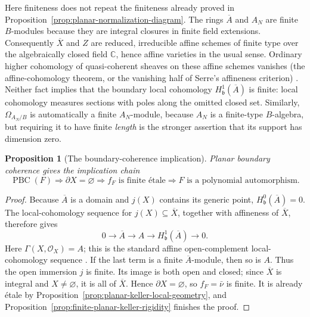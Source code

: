 \documentclass[11pt]{article}
\newtheorem{proposition}[theorem]{Proposition}
\theoremstyle{remark}
\theoremstyle{definition}
\newcommand{\C}{\mathbb C}
\begin{document}
Here finiteness does not repeat the finiteness already proved in
Proposition~\ref{prop:planar-normalization-diagram}.  The rings
\(\overline A\) and \(A_N\) are finite \(B\)-modules because they are
integral closures in finite field extensions.  Consequently
\(\overline X\) and \(Z\) are reduced, irreducible affine schemes of finite
type over the algebraically closed field \(\C\), hence affine varieties in
the usual sense.  Ordinary higher cohomology of quasi-coherent sheaves on
these affine schemes vanishes (the affine-cohomology theorem, or the
vanishing half of Serre's affineness criterion)
\cite{StacksAffineCohomology}.  Neither fact implies that
the boundary local cohomology \(H^1_{\mathfrak b}(\overline A)\) is finite:
local cohomology measures sections with poles along the omitted closed set.
Similarly, \(\Omega_{A_N/B}\) is automatically a finite \(A_N\)-module,
because \(A_N\) is a finite-type \(B\)-algebra, but requiring it to have
finite \emph{length} is the stronger assertion that its support has
dimension zero.

\begin{proposition}[The boundary-coherence implication]
\label{prop:planar-boundary-coherence-route}
Planar boundary coherence gives the implication chain
\[
  \operatorname{PBC}(F)
  \Longrightarrow
  \partial X=\varnothing
  \Longrightarrow
  f_F\text{ is finite \'{e}tale}
  \Longrightarrow
  F\text{ is a polynomial automorphism}.
\]
\end{proposition}

\begin{proof}
Because \(\overline A\) is a domain and \(j(X)\) contains its generic point,
\(H^0_{\mathfrak b}(\overline A)=0\).  The local-cohomology sequence for
\(j(X)\subseteq\overline X\), together with affineness of \(\overline X\),
therefore gives
\[
  0\longrightarrow\overline A
  \longrightarrow A
  \longrightarrow H^1_{\mathfrak b}(\overline A)
  \longrightarrow0.
\]
Here \(\Gamma(X,\mathcal O_X)=A\); this is the standard affine
open-complement local-cohomology sequence
\cite{StacksLocalCohomologySequence}.
If the last term is a finite \(\overline A\)-module, then so is \(A\).
Thus the open immersion \(j\) is finite.  Its image is both open and closed;
since \(\overline X\) is integral and \(X\neq\varnothing\), it is all of
\(\overline X\).  Hence \(\partial X=\varnothing\), so
\(f_F=\bar\nu\) is finite.  It is already \'{e}tale by
Proposition~\ref{prop:planar-keller-local-geometry}, and
Proposition~\ref{prop:finite-planar-keller-rigidity} finishes the proof.
\end{proof}
\end{document}
